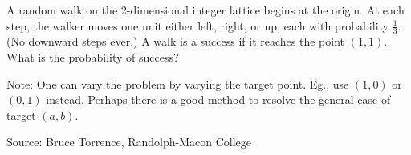 A random walk on the 2-dimensional integer lattice begins at the origin. At each step, the walker moves one unit either left, right, or up, each with probability $\frac13$. (No downward steps ever.) A walk is a success if it reaches the point $(1,1)$. What is the probability of success?

Note: One can vary the problem by varying the target point. Eg., use $(1, 0)$ or $(0,1)$ instead. Perhaps there is a good method to resolve the general case of target $(a, b)$.

Source: Bruce Torrence, Randolph-Macon College
